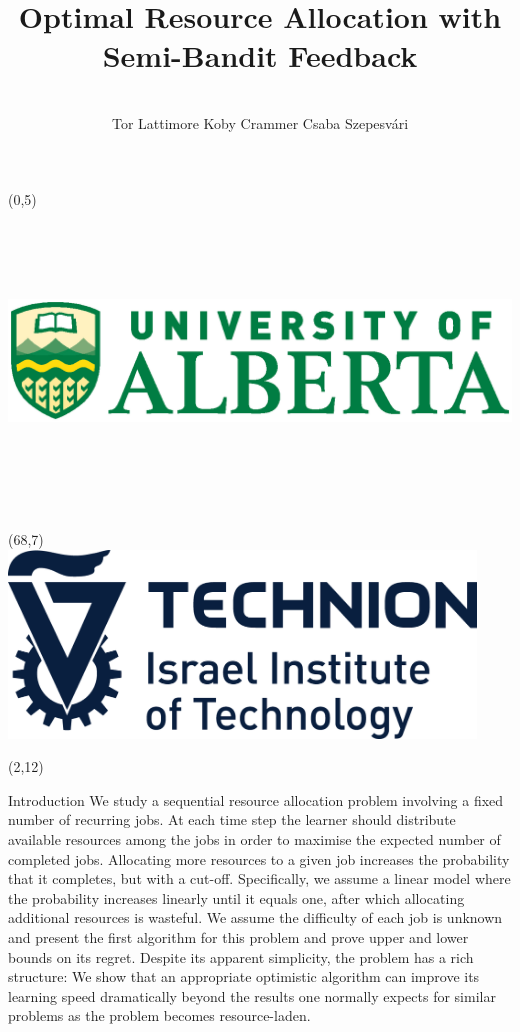 \documentclass[nofooter,scale=1.4]{poster}
\title{Optimal Resource Allocation with Semi-Bandit Feedback}
\author{\mbox{}\\[1.3cm] Tor Lattimore \hspace{2cm} Koby Crammer \hspace{2cm} Csaba Szepesv\'ari}
\date{}
\begin{document}
\begin{frame}

\begin{textblock}{20}(0,5)
\includegraphics[height=8cm]{UoA-logo}
\end{textblock}

\begin{textblock}{20}(68,7)
\includegraphics[height=5cm]{technion-logo}
\end{textblock}


\begin{textblock}{25.33}(2,12)
\begin{block}{Introduction}
\justifying
We study a sequential resource allocation problem involving a fixed number of recurring jobs.
%
At each time step the learner should distribute available resources among the jobs in order to maximise the expected number of completed jobs. 
%
Allocating more resources to a given job increases the probability
that it completes, but with a cut-off. %
Specifically, we assume a linear
model where the probability increases linearly until it equals one, after which
allocating additional resources is wasteful.
%
We assume the difficulty of each job is unknown
and present the first algorithm for this problem and prove upper and lower bounds on its regret.
Despite its apparent simplicity, the problem has a rich structure: 
We show that an appropriate optimistic algorithm can improve its learning speed dramatically 
beyond the results one normally expects for similar problems
as the problem becomes resource-laden.
\end{block}


\end{textblock}
\end{frame}
\end{document}
